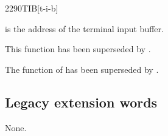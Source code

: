 \begin{worddef}{2290}{TIB}[t-i-b]
\item {}

	 is the address of the terminal input buffer.

\note
	This function has been superseded by .

	\begin{rationale} %
		The function of  has been superseded by
		.
	\end{rationale}
\end{worddef}

\subsection{Legacy extension words} %
\extended

None.

